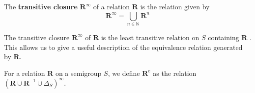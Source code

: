 \begin{definition}
  \label{def:transitiveclosure}
  The \textbf{transitive closure} $\mathbf{R}^\infty$ of a relation $\mathbf{R}$
  is the relation given by
  $$\mathbf{R}^\infty=\bigcup_{n \in \mathbb{N}}\mathbf{R}^n$$
\end{definition}

The transitive closure $\mathbf{R}^\infty$ of $\mathbf{R}$ is the least
transitive relation on $S$ containing $\mathbf{R}$ \cite[Lemma
2.3]{mtorpey_msc}.  This allows us to give a useful description of the
equivalence relation generated by $\mathbf{R}$.

\begin{definition}
  \label{def:re}
  For a relation $\mathbf{R}$ on a semigroup $S$, we define $\mathbf{R}^e$ as
  the relation $\left(\mathbf{R} \cup \mathbf{R}^{-1} \cup \Delta_S\right)^\infty$.
\end{definition}

